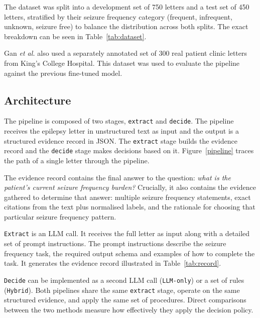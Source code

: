 \documentclass[conference]{IEEEtran}
\begin{document}
The dataset was split into a development set of 750
letters and a test set of 450 letters, stratified by their 
seizure frequency category (frequent, infrequent, 
unknown, seizure free) to balance the distribution 
across both splits. The exact breakdown can be 
seen in Table~\ref{tab:dataset}.

Gan \emph{et al.} \cite{b3} also used a separately annotated 
set of 300 real patient clinic letters from King's College Hospital. 
This dataset was used to evaluate the pipeline against the
previous fine-tuned model. 

\subsection{Architecture}
\label{sec:architecture}

The pipeline is composed of two stages, \texttt{extract} and 
\texttt{decide}. The pipeline receives the epilepsy letter 
in unstructured text as input and the output is a structured evidence
record in JSON. The \texttt{extract} stage builds the evidence record
and the \texttt{decide} stage makes decisions based on it. 
Figure~\ref{pipeline} traces the path of a single letter through 
the pipeline. 

The evidence record contains the final 
answer to the question: \emph{what is the patient's current
seizure frequency burden?} Crucially, it also contains the evidence 
gathered to determine that answer: multiple seizure 
frequency statements, exact citations from the text plus
normalised labels, and the rationale for choosing that 
particular seizure frequency pattern. 

\texttt{Extract} is an LLM call. It receives the full letter
as input along with a detailed set of prompt instructions. 
The prompt instructions describe the seizure frequency task, 
the required output schema and examples of how to 
complete the task. It generates the evidence record 
illustrated in Table~\ref{tab:record}.

\texttt{Decide} can be implemented as a second 
LLM call (\texttt{LLM-only}) or a set of rules (\texttt{Hybrid}). 
Both pipelines share the same \texttt{extract} stage, operate 
on the same structured evidence, 
and apply the same set of procedures. Direct comparisons 
between the two methods measure how effectively they 
apply the decision policy. 
\end{document}
